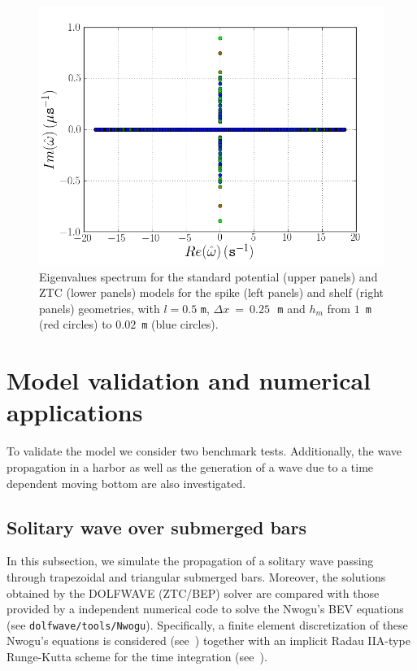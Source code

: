 \begin{figure}
\begin{center}
\includegraphics[type=png,ext=.png,read=.png,width=\smallfig]{chapters/lopes/png/L_0.5_dx_0.25_hm_shelf_spectrum_Zhao}
\end{center}
\caption{Eigenvalues spectrum for the standard potential
 (upper panels) and ZTC (lower panels)
 models for the spike (left panels) and
 shelf (right panels) geometries, with  $l=0.5$ {\tt m},
 $\Delta x~=~0.25$\,~{\tt m} and $h_m$ from $1$~{\tt m} (red circles)
 to $0.02$~{\tt m} (blue circles).}
 \label{fig:lopes:spectrumhm3}
 \end{figure}


\section{Model validation and numerical applications}\label{sec:lopes:numericaltests}
To validate the model  we consider two benchmark tests.
Additionally, the wave propagation in a harbor as well as the
generation of a wave due to a time dependent  moving bottom
are also investigated.

\subsection{Solitary wave over  submerged bars}
In this subsection, we simulate the propagation of a
solitary wave passing through  trapezoidal and  triangular
submerged bars.
Moreover,
the solutions obtained by the DOLFWAVE (ZTC/BEP) solver are
compared with those provided by a \fenics independent
numerical code to solve the Nwogu's BEV equations (see
{\tt dolfwave/tools/Nwogu}).  Specifically, a finite element
discretization of these Nwogu's equations is considered
(see~\cite{Walkley1999}) together with an
implicit Radau IIA-type Runge-Kutta scheme
 for the time integration (see~\cite{HairerWanner1991b}).


